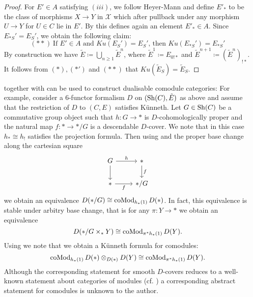 \begin{proof}
For $E' \in A$ satisfying $(iii)$, we follow Heyer-Mann and define $E'_*$ to be the class of morphisms $X \to Y$ in $\mathcal{X}$ which after pullback under any morphism $U \to Y$ for $U\in C$ lie in $E'$. By \Cite[Theorem 3.4.11]{heyer20246} this defines again an element $E'_* \in A$. Since $E_{*S}'=E_S'$, we obtain the following claim:
\[
(\ast \ast) \ \text{If $E'\in A$  and $Ku(E_S')= E_S'$, then $Ku(E_{*S}')= E_{*S}'$}
\]
By construction we have $\tilde{E}\coloneqq \bigcup_{n \geq 1} \tilde{E}^n$, where $\tilde{E}^1\coloneqq E_{0!*}$ and $\tilde{E}^{n+1}\coloneqq (\tilde{E}^{n})_{!*}$. It follows from $(\ast),(\ast')$ and $(\ast \ast)$ that $Ku(\tilde{E}_S)=\tilde{E}_S$.
\end{proof}
\begin{remark}
 together with  can be used to construct dualisable comodule categories: For example, consider a $6$-functor formalism $D$ on $(\operatorname{Sh}(C),\tilde{E})$ as above and assume that the restriction of $D$ to $(C,E)$ satisfies Künneth. Let $G \in \operatorname{Sh}(C)$ be a commutative group object such that $h: G\to \ast$ is $D$-cohomologically proper and the natural map $f: \ast \to \ast/G$ is a descendable $D$-cover. We note that in this case $h_*\cong h_!$ satisfies the projection formula. Then using  and the proper base change along the cartesian square 
\[\begin{tikzcd}
	G & \ast \\
	\ast & {\ast/G}
	\arrow["h", from=1-1, to=1-2]
	\arrow[from=1-1, to=2-1]
	\arrow["f", from=1-2, to=2-2]
	\arrow["f"', from=2-1, to=2-2]
\end{tikzcd}\]
we obtain an equivalence $D(\ast/G)\cong \operatorname{coMod}_{h_*(1)}D(\ast)$. In fact, this equivalence is stable under arbitry base change, that is for any $\pi: Y \to \ast$ we obtain an equivalence 
\[
D(\ast/G \times_\ast Y)\cong \operatorname{coMod}_{\pi^*h_*(1)}D(Y).
\]
Using   we note that we obtain a Künneth formula for comodules: 
\[
\operatorname{coMod}_{h_*(1)}D(\ast) \otimes_{D(\ast)} D(Y)\cong \operatorname{coMod}_{\pi^*h_*(1)}D(Y). 
\]
Although the corresponding statement for smooth $D$-covers reduces to a well-known statement about categories of modules (cf. \Cite[Proposition 4.1]{ben2010integral}) a corresponding abstract statement for comodules is unknown to the author.
\end{remark}

